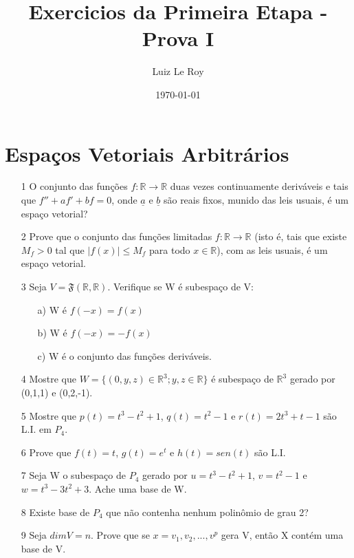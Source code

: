 \documentclass[11pt]{article}
\title{Exercicios da Primeira Etapa - Prova I}
\date{\mydate\today}
\author{Luiz Le Roy}
\begin{document}
  \maketitle

\section*{Espaços Vetoriais Arbitrários}
\begin{itemize}
\item[1] O conjunto das funções $f:\mathbb{R}\longrightarrow \mathbb{R}$ duas vezes continuamente deriváveis e tais que $f''+af'+bf=0$, onde $\underline{a}$ e $\underline{b}$ são reais fixos, munido das leis usuais, é um espaço vetorial?

\item[2] Prove que o conjunto das funções limitadas $f:\mathbb{R}\longrightarrow \mathbb{R}$ (isto é, tais que existe $M_f>0$ tal que $|f(x)|\leq M_f$ para todo $x\in \mathbb{R}$), com as leis usuais, é um espaço vetorial.

\item[3] Seja $V=\mathfrak{F}(\mathbb{R,R})$. Verifique se W é subespaço de V:
\begin{itemize}
\item [a)] W é $f(-x)=f(x)$
\item [b)] W é $f(-x)=-f(x)$
\item[c)] W é o conjunto das funções deriváveis.
\end{itemize}

\item[4] Mostre que $W=\{(0,y,z)\in \mathbb{R}^3;y,z \in \mathbb{R}\}$ é subespaço  de $\mathbb{R}^3$ gerado por (0,1,1) e (0,2,-1).

\item[5] Mostre que $p(t)=t^3-t^2+1$, $q(t)=t^2-1$ e $r(t)=2t^3+t-1$ são L.I. em $P_4$.

\item[6] Prove que $f(t)=t$, $g(t)=e^t$ e $h(t)=sen(t)$ são L.I.

\item[7] Seja W o subespaço de $P_4$ gerado por $u=t^3-t^2+1$, $v=t^2-1$ e $w=t^3-3t^2+3$. Ache uma base de W.

\item[8] Existe base de $P_4$ que não contenha nenhum polinômio de grau 2?

\item[9] Seja $dimV=n$. Prove que se $x={v_1,v_2,...,v^p}$ gera V, então X contém uma base de V.


\end{itemize}
\end{document}
